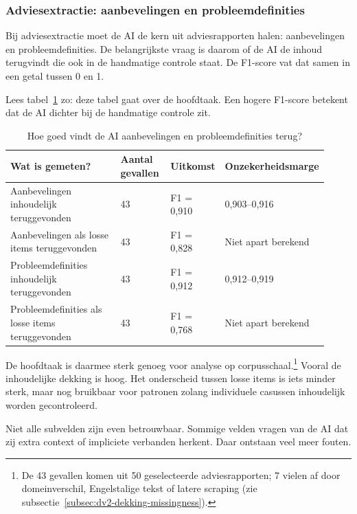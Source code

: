 \subsubsection{Adviesextractie: aanbevelingen en probleemdefinities}
\label{subsubsec:dv2-golden-adviesextractie}

Bij adviesextractie moet de AI de kern uit adviesrapporten halen: aanbevelingen en probleemdefinities. De belangrijkste vraag is daarom of de AI de inhoud terugvindt die ook in de handmatige controle staat. De F1-score vat dat samen in een getal tussen 0 en 1.

Lees tabel~\ref{tab:dv2-golden-set-adviesextractie-hoofd} zo: deze tabel gaat over de hoofdtaak. Een hogere F1-score betekent dat de AI dichter bij de handmatige controle zit.

\begin{table}[htbp]
\centering
\small
\caption{Hoe goed vindt de AI aanbevelingen en probleemdefinities terug?}
\label{tab:dv2-golden-set-adviesextractie-hoofd}
\begin{tabular}{p{0.38\linewidth}p{0.16\linewidth}p{0.16\linewidth}p{0.22\linewidth}}
\hline
Wat is gemeten? & Aantal gevallen & Uitkomst & Onzekerheidsmarge \\
\hline
Aanbevelingen inhoudelijk teruggevonden & 43 & F1 = 0,910 & 0,903--0,916 \\
Aanbevelingen als losse items teruggevonden & 43 & F1 = 0,828 & Niet apart berekend \\
Probleemdefinities inhoudelijk teruggevonden & 43 & F1 = 0,912 & 0,912--0,919 \\
Probleemdefinities als losse items teruggevonden & 43 & F1 = 0,768 & Niet apart berekend \\
\hline
\end{tabular}
\end{table}

De hoofdtaak is daarmee sterk genoeg voor analyse op corpusschaal.\footnote{De 43 gevallen komen uit 50 geselecteerde adviesrapporten; 7 vielen af door domeinverschil, Engelstalige tekst of latere scraping (zie subsectie~\ref{subsec:dv2-dekking-missingness}).} Vooral de inhoudelijke dekking is hoog. Het onderscheid tussen losse items is iets minder sterk, maar nog bruikbaar voor patronen zolang individuele casussen inhoudelijk worden gecontroleerd.

Niet alle subvelden zijn even betrouwbaar. Sommige velden vragen van de AI dat zij extra context of impliciete verbanden herkent. Daar ontstaan veel meer fouten.


